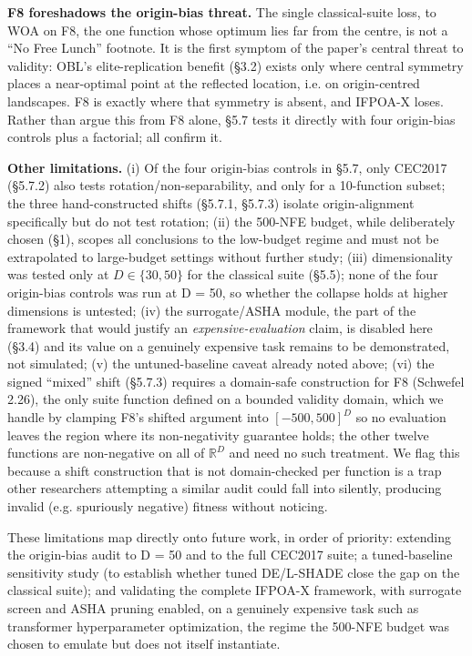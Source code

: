 \documentclass[preprint,12pt]{elsarticle}
\begin{document}
\textbf{F8 foreshadows the origin-bias threat.} The single classical-suite loss, to WOA on F8, the one function whose optimum lies far from the centre, is not a ``No Free Lunch'' footnote. It is the first symptom of the paper's central threat to validity: OBL's elite-replication benefit (\S3.2) exists only where central symmetry places a near-optimal point at the reflected location, i.e. on origin-centred landscapes. F8 is exactly where that symmetry is absent, and IFPOA-X loses. Rather than argue this from F8 alone, \S5.7 tests it directly with four origin-bias controls plus a factorial; all confirm it.

\textbf{Other limitations.} (i) Of the four origin-bias controls in \S5.7, only CEC2017 (\S5.7.2) also tests rotation/non-separability, and only for a 10-function subset; the three hand-constructed shifts (\S5.7.1, \S5.7.3) isolate origin-alignment specifically but do not test rotation; (ii) the 500-NFE budget, while deliberately chosen (\S1), scopes all conclusions to the low-budget regime and must not be extrapolated to large-budget settings without further study; (iii) dimensionality was tested only at $D \in \{30, 50\}$ for the classical suite (\S5.5); none of the four origin-bias controls was run at D = 50, so whether the collapse holds at higher dimensions is untested; (iv) the surrogate/ASHA module, the part of the framework that would justify an \emph{expensive-evaluation} claim, is disabled here (\S3.4) and its value on a genuinely expensive task remains to be demonstrated, not simulated; (v) the untuned-baseline caveat already noted above; (vi) the signed ``mixed'' shift (\S5.7.3) requires a domain-safe construction for F8 (Schwefel 2.26), the only suite function defined on a bounded validity domain, which we handle by clamping F8's shifted argument into $[-500,500]^D$ so no evaluation leaves the region where its non-negativity guarantee holds; the other twelve functions are non-negative on all of $\mathbb{R}^D$ and need no such treatment. We flag this because a shift construction that is not domain-checked per function is a trap other researchers attempting a similar audit could fall into silently, producing invalid (e.g. spuriously negative) fitness without noticing.

These limitations map directly onto future work, in order of priority: extending the origin-bias audit to D = 50 and to the full CEC2017 suite; a tuned-baseline sensitivity study (to establish whether tuned DE/L-SHADE close the gap on the classical suite); and validating the complete IFPOA-X framework, with surrogate screen and ASHA pruning enabled, on a genuinely expensive task such as transformer hyperparameter optimization, the regime the 500-NFE budget was chosen to emulate but does not itself instantiate.
\end{document}
